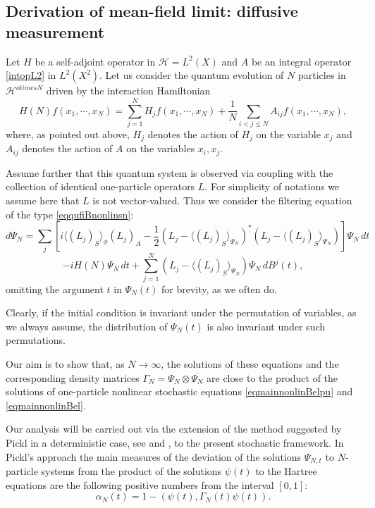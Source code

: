 \documentclass[12pt]{article}
\def\HC{\mathcal{H}}
\def\al{\alpha}
\newcommand{\Ga}{\Gamma}
\begin{document}
\subsection{Derivation of mean-field limit: diffusive measurement}
\label{secmynonlinSchrod}


Let $H$ be a self-adjoint operator in $\HC=L^2(X)$
and $A$ be an integral operator \eqref{intopL2} in $L^2(X^2)$.
Let us consider the quantum evolution of $N$ particles in $\HC^{otimes N}$
driven by the interaction Hamiltonian
\begin{equation}
\label{eqHambinaryinter0}
 H(N)f(x_1, \cdots , x_N)=\sum_{j=1}^N H_jf(x_1, \cdots , x_N)
 + \frac{1}{N}\sum_{i<j\le N} A_{ij}f(x_1, \cdots , x_N),
\end{equation}
where, as pointed out above, $H_j$ denotes the action of $H_j$ on the variable $x_j$
and $A_{ij}$ denotes the action of $A$ on the variables $x_i,x_j$.

Assume further that this quantum system is observed
via coupling with the collection of identical one-particle operators $L$.
For simplicity of notations we assume here
that $L$ is not vector-valued.
 Thus we consider the filtering equation of the type \eqref{eqqufiBnonlinsn}:
\[
d\Psi_N = \sum_j [i \langle (L_j)_S\rangle_{\phi} (L_j)_A
 -\frac12 (L_j-\langle (L_j)_S \rangle_{\Psi_N})^*(L_j-\langle (L_j)_S\rangle_{\Psi_N})]\Psi_N \, dt
\]
\begin{equation}
\label{eqmainNpartBelnonls}
-iH(N) \Psi_N \, dt+\sum_{j=1}^N (L_j-\langle (L_j)_S\rangle_{\Psi_N})\Psi_N \, dB^j(t),
\end{equation}
omitting the argument $t$ in $\Psi_N(t)$ for brevity, as we often do.

Clearly, if the initial condition is invariant under the permutation of variables, as we always assume,
the distribution of $\Psi_N(t)$ is also invariant under such permutations.

Our aim is to show that, as $N\to \infty$, the solutions of these equations
and the corresponding density matrices $\Ga_N=\Psi_N\otimes \overline{\Psi_N}$
are close to the product of the solutions of one-particle nonlinear stochastic
equations \eqref{eqmainnonlinBelpu} and \eqref{eqmainnonlinBel}.


Our analysis will be carried out via the extension of the method suggested
by Pickl in a deterministic case,
see \cite{Pickl} and  \cite{KnowlesPickl}, to the present stochastic framework.
In Pickl's approach the main measures of the deviation of the solutions $\Psi_{N,t}$ to $N$-particle
systems from the product of the solutions $\psi(t)$ to the Hartree equations are the following positive numbers
from the interval $[0,1]$:
\[
\al_N(t)=1-(\psi(t), \Ga_N(t) \psi(t)).
\]
\end{document}
